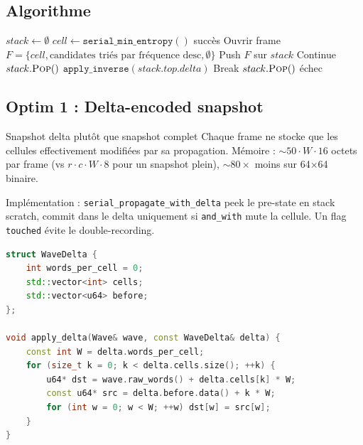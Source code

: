 \subsection{Algorithme}

\begin{algorithm}[H]
\caption{Backtracking avec snapshot delta-encodé}
\begin{algorithmic}[1]
\State $stack \gets \emptyset$
\Loop
    \State $cell \gets \texttt{serial\_min\_entropy}()$
        \State \Return succès
    \EndIf
    \State Ouvrir frame $F = \{cell, \text{candidates triés par fréquence desc}, \emptyset\}$
    \State Push $F$ sur $stack$
        \State Continue 
    \EndIf
    \State $stack.\textsc{Pop}()$
        \State $\texttt{apply\_inverse}(stack.top.delta)$ 
            \State Break 
        \EndIf
        \State $stack.\textsc{Pop}()$
    \EndWhile
        \State \Return échec
    \EndIf
\EndLoop
\end{algorithmic}
\end{algorithm}

\subsection{Optim 1 : Delta-encoded snapshot}

\begin{important}{Snapshot delta plutôt que snapshot complet}
Chaque frame ne stocke que les cellules effectivement modifiées par sa propagation. Mémoire : $\sim 50 \cdot W \cdot 16$ octets par frame (vs $r \cdot c \cdot W \cdot 8$ pour un snapshot plein), $\sim 80\times$ moins sur 64×64 binaire.
\end{important}

Implémentation : \texttt{serial\_propagate\_with\_delta} peek le pre-state en stack scratch, commit dans le delta uniquement si \texttt{and\_with} mute la cellule. Un flag \texttt{touched} évite le double-recording.

\begin{lstlisting}[language=C++]
struct WaveDelta {
    int words_per_cell = 0;
    std::vector<int> cells;
    std::vector<u64> before;
};

void apply_delta(Wave& wave, const WaveDelta& delta) {
    const int W = delta.words_per_cell;
    for (size_t k = 0; k < delta.cells.size(); ++k) {
        u64* dst = wave.raw_words() + delta.cells[k] * W;
        const u64* src = delta.before.data() + k * W;
        for (int w = 0; w < W; ++w) dst[w] = src[w];
    }
}
\end{lstlisting}

